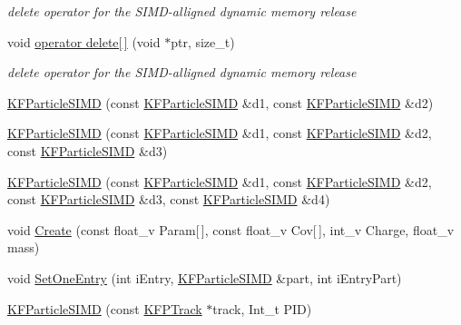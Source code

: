 \begin{DoxyCompactItemize}
\begin{DoxyCompactList}\small\item\em delete operator for the S\+I\+M\+D-\/alligned dynamic memory release \end{DoxyCompactList}\item 
void \hyperlink{classKFParticleSIMD_aa06459fe7a2a956252426665a7560d70}{operator delete\mbox{[}$\,$\mbox{]}} (void $\ast$ptr, size\+\_\+t)\hypertarget{classKFParticleSIMD_aa06459fe7a2a956252426665a7560d70}{}\label{classKFParticleSIMD_aa06459fe7a2a956252426665a7560d70}

\begin{DoxyCompactList}\small\item\em delete operator for the S\+I\+M\+D-\/alligned dynamic memory release \end{DoxyCompactList}\item 
\hyperlink{classKFParticleSIMD_a1f82fd50063e4d0f690182f21e6d845e}{K\+F\+Particle\+S\+I\+MD} (const \hyperlink{classKFParticleSIMD}{K\+F\+Particle\+S\+I\+MD} \&d1, const \hyperlink{classKFParticleSIMD}{K\+F\+Particle\+S\+I\+MD} \&d2)
\item 
\hyperlink{classKFParticleSIMD_af71f73034a9c256674afb8442675137c}{K\+F\+Particle\+S\+I\+MD} (const \hyperlink{classKFParticleSIMD}{K\+F\+Particle\+S\+I\+MD} \&d1, const \hyperlink{classKFParticleSIMD}{K\+F\+Particle\+S\+I\+MD} \&d2, const \hyperlink{classKFParticleSIMD}{K\+F\+Particle\+S\+I\+MD} \&d3)
\item 
\hyperlink{classKFParticleSIMD_a3a4d5a4c75ea28e9d993ec9fc7d4fbe8}{K\+F\+Particle\+S\+I\+MD} (const \hyperlink{classKFParticleSIMD}{K\+F\+Particle\+S\+I\+MD} \&d1, const \hyperlink{classKFParticleSIMD}{K\+F\+Particle\+S\+I\+MD} \&d2, const \hyperlink{classKFParticleSIMD}{K\+F\+Particle\+S\+I\+MD} \&d3, const \hyperlink{classKFParticleSIMD}{K\+F\+Particle\+S\+I\+MD} \&d4)
\item 
void \hyperlink{classKFParticleSIMD_ad72c41822502b24af50578767c5fb458}{Create} (const float\+\_\+v Param\mbox{[}$\,$\mbox{]}, const float\+\_\+v Cov\mbox{[}$\,$\mbox{]}, int\+\_\+v Charge, float\+\_\+v mass)
\item 
void \hyperlink{classKFParticleSIMD_a6953ec75b546abb57f1b3fdb035bf337}{Set\+One\+Entry} (int i\+Entry, \hyperlink{classKFParticleSIMD}{K\+F\+Particle\+S\+I\+MD} \&part, int i\+Entry\+Part)
\item 
\hyperlink{classKFParticleSIMD_ab2387938a4518b2a9fbd79b5132d33c8}{K\+F\+Particle\+S\+I\+MD} (const \hyperlink{classKFPTrack}{K\+F\+P\+Track} $\ast$track, Int\+\_\+t P\+ID)

\end{DoxyCompactItemize}
